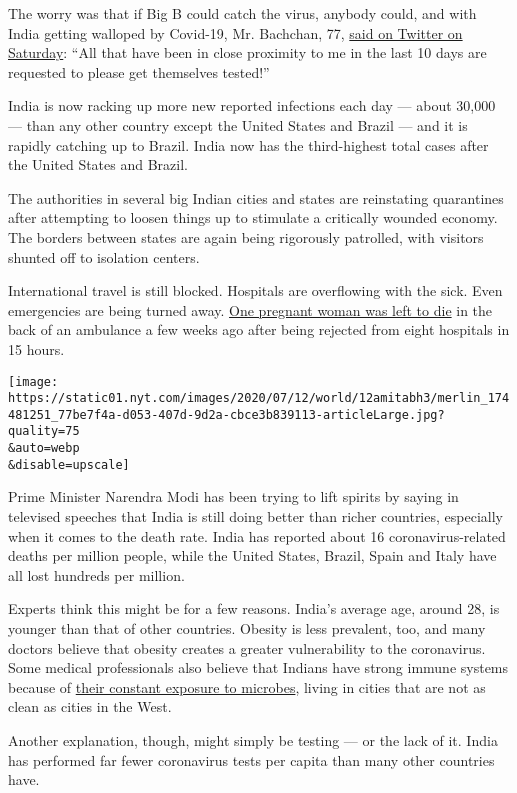 The worry was that if Big B could catch the virus, anybody could, and
with India getting walloped by Covid-19, Mr. Bachchan, 77,
\href{https://twitter.com/SrBachchan/status/1282002456063295490}{said on
Twitter on Saturday}: ``All that have been in close proximity to me in
the last 10 days are requested to please get themselves tested!''

India is now racking up more new reported infections each day --- about
30,000 --- than any other country except the United States and Brazil
--- and it is rapidly catching up to Brazil. India now has the
third-highest total cases after the United States and Brazil.

The authorities in several big Indian cities and states are reinstating
quarantines after attempting to loosen things up to stimulate a
critically wounded economy. The borders between states are again being
rigorously patrolled, with visitors shunted off to isolation centers.

International travel is still blocked. Hospitals are overflowing with
the sick. Even emergencies are being turned away.
\href{https://www.nytimes.com/2020/06/21/world/asia/coronavirus-india-hospitals-pregnant.html}{One
pregnant woman was left to die} in the back of an ambulance a few weeks
ago after being rejected from eight hospitals in 15 hours.

\texttt{[image: https://static01.nyt.com/images/2020/07/12/world/12amitabh3/merlin\_174481251\_77be7f4a-d053-407d-9d2a-cbce3b839113-articleLarge.jpg?quality=75\\\&auto=webp\\\&disable=upscale]}

Prime Minister Narendra Modi has been trying to lift spirits by saying
in televised speeches that India is still doing better than richer
countries, especially when it comes to the death rate. India has
reported about 16 coronavirus-related deaths per million people, while
the United States, Brazil, Spain and Italy have all lost hundreds per
million.

Experts think this might be for a few reasons. India's average age,
around 28, is younger than that of other countries. Obesity is less
prevalent, too, and many doctors believe that obesity creates a greater
vulnerability to the coronavirus. Some medical professionals also
believe that Indians have strong immune systems because of
\href{http://www.pharmabiz.com/NewsDetails.aspx?aid=126323\&sid=1}{their
constant exposure to microbes}, living in cities that are not as clean
as cities in the West.

Another explanation, though, might simply be testing --- or the lack of
it. India has performed far fewer coronavirus tests per capita than many
other countries have.

